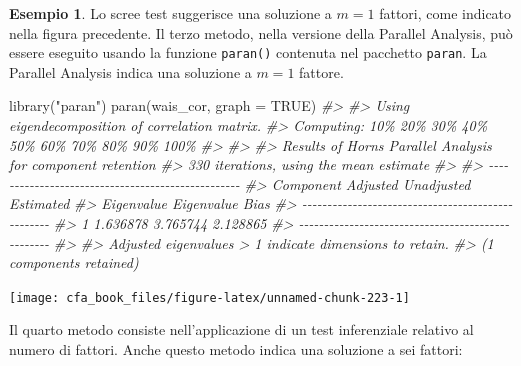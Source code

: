 \documentclass[
  11pt,
]{krantz}
\makeatletter
\newenvironment{Shaded}{\begin{snugshade}}{\end{snugshade}}
\newcommand{\AttributeTok}[1]{\textcolor[rgb]{0.61,0.61,0.61}{#1}}
\newcommand{\CommentTok}[1]{\textcolor[rgb]{0.37,0.37,0.37}{\textit{#1}}}
\newcommand{\ConstantTok}[1]{\textcolor[rgb]{0,0,0}{#1}}
\newcommand{\FunctionTok}[1]{\textcolor[rgb]{0,0,0}{#1}}
\newcommand{\NormalTok}[1]{#1}
\newcommand{\StringTok}[1]{\textcolor[rgb]{0.5,0.5,0.5}{#1}}
\newenvironment{kframe}{%
\medskip{}
\setlength{\fboxsep}{.8em}
 \def\at@end@of@kframe{}%
 \ifinner\ifhmode%
  \def\at@end@of@kframe{\end{minipage}}%
  \begin{minipage}{\columnwidth}%
 \fi\fi%
 \def\FrameCommand##1{\hskip\@totalleftmargin \hskip-\fboxsep
 \colorbox{shadecolor}{##1}\hskip-\fboxsep
     \hskip-\linewidth \hskip-\@totalleftmargin \hskip\columnwidth}%
 \MakeFramed {\advance\hsize-\width
   \@totalleftmargin\z@ \linewidth\hsize
   \@setminipage}}%
 {\par\unskip\endMakeFramed%
 \at@end@of@kframe}
\renewenvironment{Shaded}{\begin{kframe}}{\end{kframe}}
\theoremstyle{definition}
\theoremstyle{definition}
\newtheorem{example}{Esempio}[chapter]
\theoremstyle{definition}
\theoremstyle{definition}
\theoremstyle{remark}
\makeatother
\begin{document}
\begin{example}
Lo scree test suggerisce una soluzione a \(m=1\) fattori, come indicato nella figura precedente. Il terzo metodo, nella versione della Parallel Analysis, può essere eseguito usando la funzione \texttt{paran()} contenuta nel pacchetto \texttt{paran}. La Parallel Analysis indica una soluzione a \(m=1\) fattore.

\begin{Shaded}
\begin{Highlighting}[]
\FunctionTok{library}\NormalTok{(}\StringTok{"paran"}\NormalTok{)}
\FunctionTok{paran}\NormalTok{(wais\_cor, }\AttributeTok{graph =} \ConstantTok{TRUE}\NormalTok{)}
\CommentTok{\#\textgreater{} }
\CommentTok{\#\textgreater{} Using eigendecomposition of correlation matrix.}
\CommentTok{\#\textgreater{} Computing: 10\%  20\%  30\%  40\%  50\%  60\%  70\%  80\%  90\%  100\%}
\CommentTok{\#\textgreater{} }
\CommentTok{\#\textgreater{} }
\CommentTok{\#\textgreater{} Results of Horn\textquotesingle{}s Parallel Analysis for component retention}
\CommentTok{\#\textgreater{} 330 iterations, using the mean estimate}
\CommentTok{\#\textgreater{} }
\CommentTok{\#\textgreater{} {-}{-}{-}{-}{-}{-}{-}{-}{-}{-}{-}{-}{-}{-}{-}{-}{-}{-}{-}{-}{-}{-}{-}{-}{-}{-}{-}{-}{-}{-}{-}{-}{-}{-}{-}{-}{-}{-}{-}{-}{-}{-}{-}{-}{-}{-}{-}{-}{-}{-} }
\CommentTok{\#\textgreater{} Component   Adjusted    Unadjusted    Estimated }
\CommentTok{\#\textgreater{}             Eigenvalue  Eigenvalue    Bias }
\CommentTok{\#\textgreater{} {-}{-}{-}{-}{-}{-}{-}{-}{-}{-}{-}{-}{-}{-}{-}{-}{-}{-}{-}{-}{-}{-}{-}{-}{-}{-}{-}{-}{-}{-}{-}{-}{-}{-}{-}{-}{-}{-}{-}{-}{-}{-}{-}{-}{-}{-}{-}{-}{-}{-} }
\CommentTok{\#\textgreater{} 1           1.636878    3.765744      2.128865}
\CommentTok{\#\textgreater{} {-}{-}{-}{-}{-}{-}{-}{-}{-}{-}{-}{-}{-}{-}{-}{-}{-}{-}{-}{-}{-}{-}{-}{-}{-}{-}{-}{-}{-}{-}{-}{-}{-}{-}{-}{-}{-}{-}{-}{-}{-}{-}{-}{-}{-}{-}{-}{-}{-}{-} }
\CommentTok{\#\textgreater{} }
\CommentTok{\#\textgreater{} Adjusted eigenvalues \textgreater{} 1 indicate dimensions to retain.}
\CommentTok{\#\textgreater{} (1 components retained)}
\end{Highlighting}
\end{Shaded}

\begin{center}\texttt{[image: cfa\_book\_files/figure-latex/unnamed-chunk-223-1]} \end{center}

Il quarto metodo consiste nell'applicazione di un test inferenziale relativo al numero di fattori. Anche questo metodo indica una soluzione a sei fattori:


\end{example}
\end{document}
